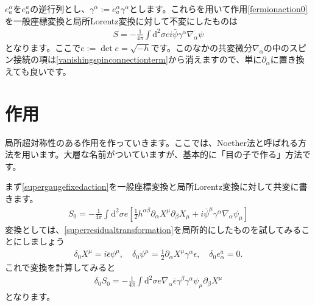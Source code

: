 \documentclass[report,paper=a4, fontsize=12pt, line_length=16cm, number_of_lines=33,dvipdfmx]{jlreq}
\numberwithin{equation}{chapter}
\numberwithin{equation}{section}
\newcommand{\del}{\partial}
\newcommand{\di}{\mathrm{d}}
\newcommand{\psib}{\bar{\psi}}
\newcommand{\epsilonb}{\bar{\epsilon}}
\begin{document}
$e_{a}^{\alpha}$を$e^{a}_{\alpha}$の逆行列とし、$\gamma^{\alpha}:=e^{\alpha}_{a}\gamma^{\alpha}$とします。これらを用いて作用\eqref{fermionaction0}を一般座標変換と局所Lorentz変換に対して不変にしたものは
\begin{align}
  S=-\frac{1}{4\pi}\int \di^2 \sigma e i\psib \gamma^{\alpha}\nabla_{\alpha}\psi
\end{align}
となります。ここで$e:=\det e=\sqrt{-h}$です。このなかの共変微分$\nabla_{\alpha}$の中のスピン接続の項は\eqref{vanishingspinconnectionterm}から消えますので、単に$\del_{\alpha}$に置き換えても良いです。

\section{作用}
局所超対称性のある作用を作っていきます。ここでは、Noether法と呼ばれる方法を用います。大層な名前がついていますが、基本的に「目の子で作る」方法です。

まず\eqref{supergaugefixedaction}を一般座標変換と局所Lorentz変換に対して共変に書きます。
\begin{align}
  S_0=-\frac{1}{4\pi}\int \di^2\sigma e\left[ 
    \frac12 h^{\alpha\beta}\del_{\alpha}X^{\mu}\del_{\beta}X_{\mu}
    +i\psib^{\mu}\gamma^{\alpha}\nabla_{\alpha}\psi_{\mu}
   \right]
\end{align}
変換としては、\eqref{superresidualtransformation}を局所的にしたものを試してみることにしましょう
\begin{align}
  \delta_{0}X^{\mu}=i\epsilonb \psi^{\mu},\quad
  \delta_{0}\psi^{\mu}=\frac12 \del_{\alpha}X^{\mu}\gamma^{\alpha}\epsilon,\quad
  \delta_{0}e^{a}_{\alpha}=0.
\end{align}
これで変換を計算してみると
\begin{align}
  \delta_{0}S_{0}=-\frac{1}{4\pi}\int \di^2 \sigma e
  \nabla_{\alpha}\epsilonb\gamma^{\beta}\gamma^{\alpha}\psi_{\mu}\del_{\beta}X^{\mu}\label{tempdelta0S0}
\end{align}
となります。
\end{document}
